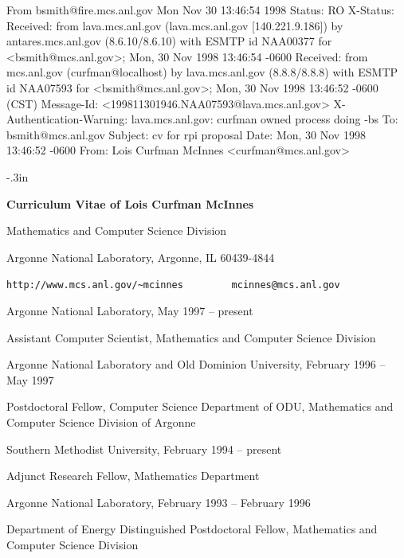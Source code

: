 From bsmith@fire.mcs.anl.gov Mon Nov 30 13:46:54 1998
Status: RO
X-Status: 
Received: from lava.mcs.anl.gov (lava.mcs.anl.gov [140.221.9.186]) by antares.mcs.anl.gov (8.6.10/8.6.10)  with ESMTP
	id NAA00377 for <bsmith@mcs.anl.gov>; Mon, 30 Nov 1998 13:46:54 -0600
Received: from mcs.anl.gov (curfman@localhost)
	by lava.mcs.anl.gov (8.8.8/8.8.8) with ESMTP id NAA07593
	for <bsmith@mcs.anl.gov>; Mon, 30 Nov 1998 13:46:52 -0600 (CST)
Message-Id: <199811301946.NAA07593@lava.mcs.anl.gov>
X-Authentication-Warning: lava.mcs.anl.gov: curfman owned process doing -bs
To: bsmith@mcs.anl.gov
Subject: cv for rpi proposal
Date: Mon, 30 Nov 1998 13:46:52 -0600
From: Lois Curfman McInnes <curfman@mcs.anl.gov>



\newcommand{\itemskip}{\vspace*{12pt}}
\newcommand{\tinyskip}{\vspace*{2pt}}

\topmargin-.3in
\textwidth6.25in
\thispagestyle{empty}


{\large
\centerline{\large\bf Curriculum Vitae of Lois Curfman McInnes}
}
\centerline{Mathematics and Computer Science Division}
\centerline{Argonne National Laboratory,
Argonne, IL  60439-4844}
\centerline{{\tt http://www.mcs.anl.gov/\~{ }mcinnes} \ \ \ \ \ \ \ \ 
{\tt mcinnes@mcs.anl.gov}}

\itemskip
{}
\begin{description}
\item 
Argonne National Laboratory, May 1997 -- present
\begin{description}
\item
Assistant Computer Scientist, Mathematics and Computer Science Division
\end{description}
\item
Argonne National Laboratory and Old Dominion University, February 1996 -- May 1997
\begin{description}
\item
Postdoctoral Fellow, Computer Science Department of ODU, Mathematics and Computer Science Division of Argonne
\end{description}
\item
Southern Methodist University, February 1994 -- present
\begin{description}
\item
Adjunct Research Fellow, Mathematics Department
\end{description}
\item
Argonne National Laboratory, February 1993 -- February 1996
\begin{description}
\item
Department of Energy Distinguished Postdoctoral Fellow, Mathematics and Computer Science Division
\end{description}
\end{description}

